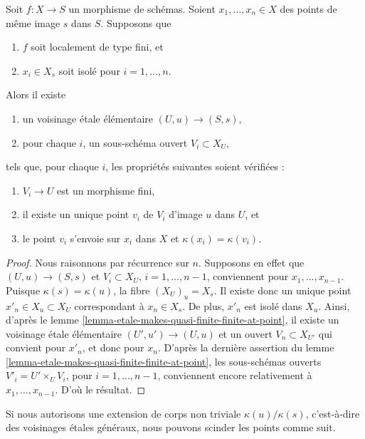 \begin{lemma}
\label{lemma-etale-makes-quasi-finite-finite-multiple-points}
Soit $f : X \to S$ un morphisme de schémas.
Soient $x_1, \ldots, x_n \in X$ des points de même image $s$ dans $S$.
Supposons que
\begin{enumerate}
\item $f$ soit localement de type fini, et
\item $x_i \in X_s$ soit isolé pour $i = 1, \ldots, n$.
\end{enumerate}
Alors il existe
\begin{enumerate}
\item[(a)] un voisinage \'etale élémentaire $(U, u) \to (S, s)$,
\item[(b)] pour chaque $i$, un sous-schéma ouvert $V_i \subset X_U$,
\end{enumerate}
tels que, pour chaque $i$, les propriétés suivantes soient vérifiées :
\begin{enumerate}
\item[(\romannumeral1)] $V_i \to U$ est un morphisme fini,
\item[(\romannumeral2)] il existe un unique point $v_i$ de $V_i$
d'image $u$ dans $U$, et
\item[(\romannumeral3)] le point $v_i$ s'envoie sur $x_i$ dans $X$ et
$\kappa(x_i) = \kappa(v_i)$.
\end{enumerate}
\end{lemma}

\begin{proof}
Nous raisonnons par récurrence sur $n$.
Supposons en effet que $(U, u) \to (S, s)$ et $V_i \subset X_U$,
$i = 1, \ldots, n - 1$, conviennent pour $x_1, \ldots, x_{n - 1}$. Puisque
$\kappa(s) = \kappa(u)$, la fibre $(X_U)_u = X_s$. Il existe donc
un unique point $x'_n \in X_u \subset X_U$ correspondant à
$x_n \in X_s$. De plus, $x'_n$ est isolé dans $X_u$. Ainsi, d'après le
lemme \ref{lemma-etale-makes-quasi-finite-finite-at-point}, il
existe un voisinage \'etale élémentaire $(U', u') \to (U, u)$
et un ouvert $V_n \subset X_{U'}$ qui convient pour $x'_n$, et donc
pour $x_n$.
D'après la dernière assertion du
lemme \ref{lemma-etale-makes-quasi-finite-finite-at-point},
les sous-schémas ouverts $V'_i = U'\times_U V_i$, pour $i = 1, \ldots, n - 1$, conviennent encore
relativement à $x_1, \ldots, x_{n - 1}$. D'où le résultat.
\end{proof}

\noindent
Si nous autorisons une extension de corps non triviale $\kappa(u)/\kappa(s)$, c'est-à-dire
des voisinages \'etales généraux, nous pouvons scinder les points comme suit.


